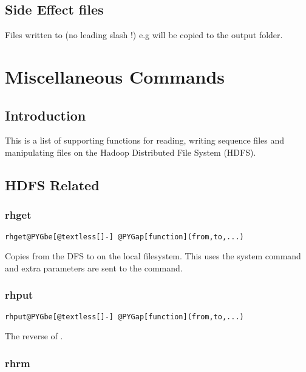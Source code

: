 \documentclass[letterpaper,10pt,english]{manual}
\begin{document}
\section{Side Effect files}

Files written to  (no leading slash !) e.g  will be copied to the output folder.

\resetcurrentobjects
\hypertarget{--doc-rhmisc}{}

\chapter{Miscellaneous Commands}


\section{Introduction}

This is a list of supporting functions for reading, writing sequence files and
manipulating files on the Hadoop Distributed File System (HDFS).


\section{HDFS Related}


\subsection{rhget}

\begin{Verbatim}[commandchars=@\[\]]
rhget@PYGbe[@textless[]-] @PYGap[function](from,to,...)
\end{Verbatim}

Copies  from the DFS to  on the local filesystem. This uses the
system command and extra parameters are sent to the  command.


\subsection{rhput}

\begin{Verbatim}[commandchars=@\[\]]
rhput@PYGbe[@textless[]-] @PYGap[function](from,to,...)
\end{Verbatim}

The reverse of .


\subsection{rhrm}
\end{document}
